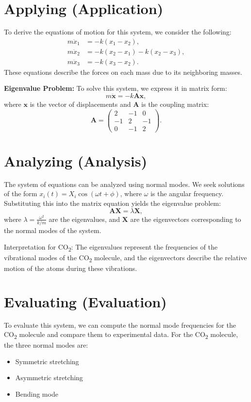 \documentclass[16pt,a4paper]{article}
\begin{document}
\section{Applying (Application)}
To derive the equations of motion for this system, we consider the following:
\begin{align}
m \ddot{x}_1 &= -k(x_1 - x_2), \tag{2} \\
m \ddot{x}_2 &= -k(x_2 - x_1) - k(x_2 - x_3), \tag{3} \\
m \ddot{x}_3 &= -k(x_3 - x_2). \tag{4}
\end{align}
These equations describe the forces on each mass due to its neighboring masses. 

\textbf{Eigenvalue Problem:}
To solve this system, we express it in matrix form:
\begin{equation}
m \ddot{\mathbf{x}} = -k \mathbf{A} \mathbf{x}, \tag{5}
\end{equation}
where $\mathbf{x}$ is the vector of displacements and $\mathbf{A}$ is the coupling matrix:
\begin{equation}
\mathbf{A} = \begin{pmatrix}
  2 & -1 & 0 \\
  -1 & 2 & -1 \\
  0 & -1 & 2
\end{pmatrix}. \tag{6}
\end{equation}

\section{Analyzing (Analysis)}
The system of equations can be analyzed using normal modes. We seek solutions of the form $x_i(t) = X_i \cos(\omega t + \phi)$, where $\omega$ is the angular frequency. Substituting this into the matrix equation yields the eigenvalue problem:
\begin{equation}
\mathbf{A} \mathbf{X} = \lambda \mathbf{X}, \tag{7}
\end{equation}
where $\lambda = \frac{\omega^2}{k/m}$ are the eigenvalues, and $\mathbf{X}$ are the eigenvectors corresponding to the normal modes of the system.

Interpretation for CO\textsubscript{2}:
The eigenvalues represent the frequencies of the vibrational modes of the CO\textsubscript{2} molecule, and the eigenvectors describe the relative motion of the atoms during these vibrations.

\section{Evaluating (Evaluation)}
To evaluate this system, we can compute the normal mode frequencies for the CO\textsubscript{2} molecule and compare them to experimental data. For the CO\textsubscript{2} molecule, the three normal modes are:
\begin{itemize}
    \item Symmetric stretching
    \item Asymmetric stretching
    \item Bending mode
\end{itemize}
\end{document}
